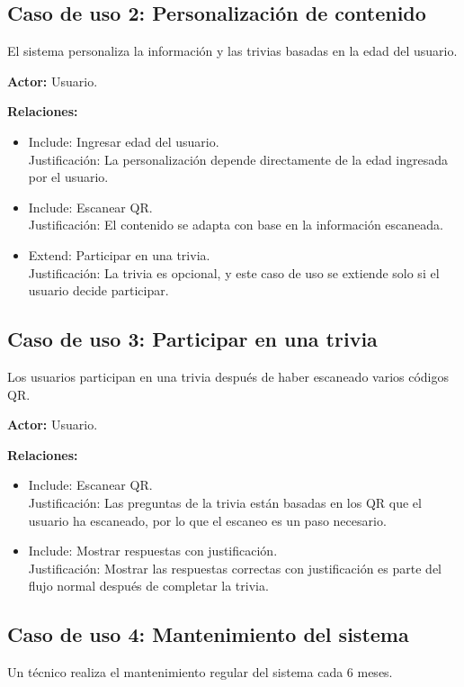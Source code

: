 \documentclass{report}
\begin{document}
    \subsection*{Caso de uso 2: Personalización de contenido}
    El sistema personaliza la información y las trivias basadas en la edad del usuario.

    \textbf{Actor:} Usuario.

    \textbf{Relaciones:}
    \begin{itemize}
        \item Include: Ingresar edad del usuario.\\
        Justificación: La personalización depende directamente de la edad ingresada por el usuario.
        \item Include: Escanear QR.\\
        Justificación: El contenido se adapta con base en la información escaneada.
        \item Extend: Participar en una trivia.\\
        Justificación: La trivia es opcional, y este caso de uso se extiende solo si el usuario decide participar.
    \end{itemize}

    \subsection*{Caso de uso 3: Participar en una trivia}
    Los usuarios participan en una trivia después de haber escaneado varios códigos QR.

    \textbf{Actor:} Usuario.

    \textbf{Relaciones:}
    \begin{itemize}
        \item Include: Escanear QR.\\
        Justificación: Las preguntas de la trivia están basadas en los QR que el usuario ha escaneado, por lo que el escaneo es un paso necesario.
        \item Include: Mostrar respuestas con justificación.\\
        Justificación: Mostrar las respuestas correctas con justificación es parte del flujo normal después de completar la trivia.
    \end{itemize}

    \subsection*{Caso de uso 4: Mantenimiento del sistema}
    Un técnico realiza el mantenimiento regular del sistema cada 6 meses.
\end{document}
